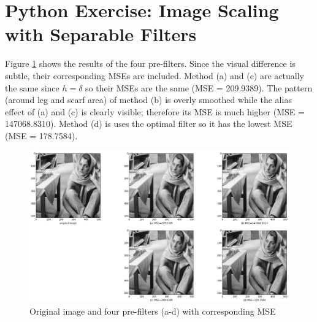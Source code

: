 \section{Python Exercise: Image Scaling with Separable Filters}\label{sec:p7}

Figure \ref{fig:p7} shows the results of the four pre-filters. Since the visual difference is subtle, their corresponding MSEs are included. Method (a) and (c) are actually the same since $h = \delta$ so their MSEs are the same (MSE = 209.9389). The pattern (around leg and scarf area) of method (b) is overly smoothed while the alias effect of (a) and (c) is clearly visible; therefore its MSE is much higher (MSE = 147068.8310). Method (d) is uses the optimal filter so it has the lowest MSE (MSE = 178.7584).

\begin{figure}[htbp]
	\centering
	\includegraphics[width=\textwidth]{images/p7}
	\caption{Original image and four pre-filters (a-d) with corresponding MSE}
	\label{fig:p7}
\end{figure}